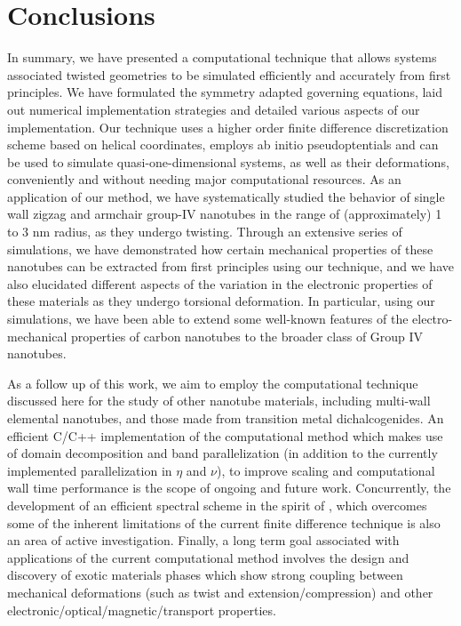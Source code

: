 \documentclass[preprint,12pt, 3p, sort&compress]{elsarticle}
\begin{document}
\section{Conclusions}
\label{sec:conclusions}
In summary, we have presented a computational technique that allows systems associated twisted geometries to be simulated efficiently and accurately from first principles. We have formulated the symmetry adapted governing equations, laid out numerical implementation strategies and detailed various aspects of our implementation. Our technique uses a higher order finite difference discretization scheme based on helical coordinates, employs ab initio pseudoptentials and can be used to simulate quasi-one-dimensional systems, as well as their deformations, conveniently and without needing major computational resources. As an application of our method, we have systematically studied the behavior of single wall zigzag and armchair group-IV nanotubes in the range of (approximately) 1 to 3 nm radius, as they undergo twisting. Through an extensive series of simulations, we have demonstrated how certain mechanical properties of these nanotubes can be extracted from first principles using our technique, and we have also elucidated different aspects of the variation in the electronic properties of these materials as they undergo torsional deformation. In particular, using our simulations, we have been able to extend some well-known features of the electro-mechanical properties of carbon nanotubes to the broader class of Group IV nanotubes.

As a follow up of this work, we aim to employ the computational technique discussed here for the study of other nanotube materials, including multi-wall elemental nanotubes, and those made from transition metal dichalcogenides. An efficient C/C++ implementation of the computational method which makes use of domain decomposition and band parallelization (in addition to the currently implemented parallelization in $\eta$ and $\nu$), to improve scaling and computational wall time performance is the scope of ongoing and future work. Concurrently, the development of an efficient spectral scheme \citep{My_Shivang_HelicES_paper, agarwal2021spectral} in the spirit of \citep{Banerjee2015spectral},  which overcomes some of the inherent limitations of the current finite difference technique is also an area of active investigation. Finally, a long term goal associated with applications of the current computational method involves the design and discovery of exotic materials phases which show strong coupling between mechanical deformations (such as twist and extension/compression) and other electronic/optical/magnetic/transport properties.
\end{document}
